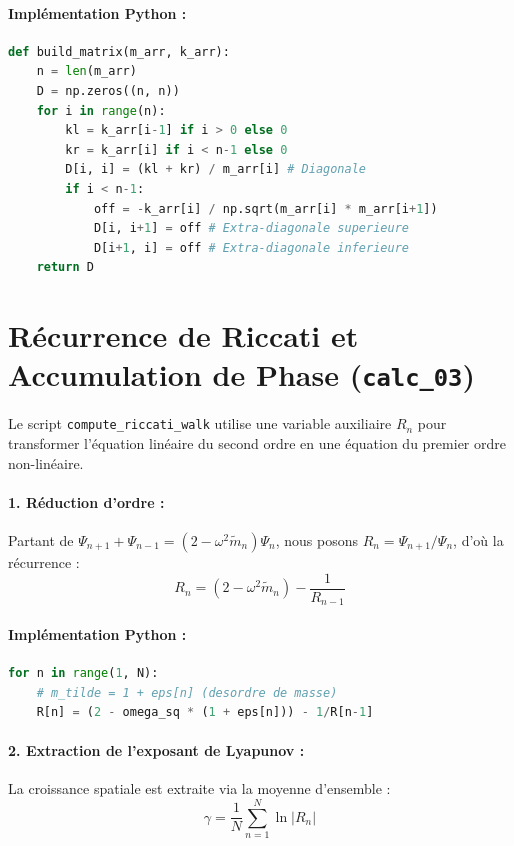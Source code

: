 \paragraph{Implémentation Python :}
\begin{lstlisting}[language=Python, caption={Construction de la matrice dynamique symétrisée}]
def build_matrix(m_arr, k_arr):
    n = len(m_arr)
    D = np.zeros((n, n))
    for i in range(n):
        kl = k_arr[i-1] if i > 0 else 0
        kr = k_arr[i] if i < n-1 else 0
        D[i, i] = (kl + kr) / m_arr[i] # Diagonale
        if i < n-1:
            off = -k_arr[i] / np.sqrt(m_arr[i] * m_arr[i+1])
            D[i, i+1] = off # Extra-diagonale superieure
            D[i+1, i] = off # Extra-diagonale inferieure
    return D
\end{lstlisting}

\section{Récurrence de Riccati et Accumulation de Phase (\texttt{calc\_03})}

Le script \texttt{compute\_riccati\_walk} utilise une variable auxiliaire $R_n$ pour transformer l'équation linéaire du second ordre en une équation du premier ordre non-linéaire.

\paragraph{1. Réduction d'ordre :}
Partant de $\Psi_{n+1} + \Psi_{n-1} = (2 - \omega^2 \tilde{m}_n) \Psi_n$, nous posons $R_n = \Psi_{n+1}/\Psi_n$, d'où la récurrence :
\begin{equation}
    R_n = (2 - \omega^2 \tilde{m}_n) - \frac{1}{R_{n-1}}
\end{equation}

\paragraph{Implémentation Python :}
\begin{lstlisting}[language=Python, caption={Boucle de récurrence de Riccati stochastique}]
for n in range(1, N):
    # m_tilde = 1 + eps[n] (desordre de masse)
    R[n] = (2 - omega_sq * (1 + eps[n])) - 1/R[n-1]
\end{lstlisting}

\paragraph{2. Extraction de l'exposant de Lyapunov :}
La croissance spatiale est extraite via la moyenne d'ensemble :
\begin{equation}
    \gamma = \frac{1}{N} \sum_{n=1}^N \ln |R_n|
\end{equation}

